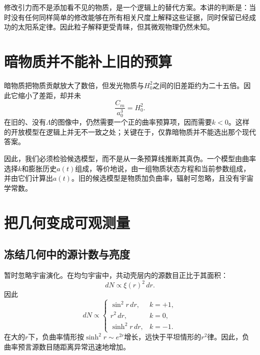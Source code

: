 修改引力而不是添加看不见的物质，是一个逻辑上的替代方案。本讲的判断是：当时没有任何同样简单的修改能够在所有相关尺度上解释这些证据，同时保留已经成功的太阳系定律。因此粒子解释更受青睐，但其微观物理仍然未知。

\section{暗物质并不能补上旧的预算}

暗物质把物质贡献放大了数倍，但发光物质与\(H_0^2\)之间的旧差距约为二十五倍。因此它缩小了差距，却并未
\begin{equation}
\frac{C_m}{a_0^3}=H_0^2.
\end{equation}
在旧的、没有\(\Lambda\)的图像中，仍然需要一个正的曲率预算项，因而需要\(k<0\)。这样的开放模型在逻辑上并无不一致之处；关键在于，仅靠暗物质并不能选出那个现代答案。

\begin{classroomqa}
\end{classroomqa}

因此，我们必须检验候选模型，而不是从一条预算线推断其真伪。一个模型由曲率选择\(k\)和膨胀历史\(a(t)\)组成，等价地说，由一组物质状态方程和当前参数组成，并由它们计算出\(a(t)\)。旧的候选模型是物质加负曲率，辐射可忽略，且没有宇宙学常数。

\section{把几何变成可观测量}

\subsection{冻结几何中的源计数与亮度}

暂时忽略宇宙演化。在均匀宇宙中，共动壳层内的源数目正比于其面积：
\begin{equation}
dN\propto \xi(r)^2\,dr.
\label{eq:c06-shell-count}
\end{equation}
因此
\begin{equation}
dN\propto
\begin{cases}
\sin^2r\,dr, & k=+1,\\
r^2\,dr, & k=0,\\
\sinh^2r\,dr, & k=-1.
\end{cases}
\end{equation}
在大的\(r\)下，负曲率情形按\(\sinh^2r\sim e^{2r}\)增长，远快于平坦情形的\(r^2\)律。因此，负曲率预言源数目随距离异常迅速地增加。

